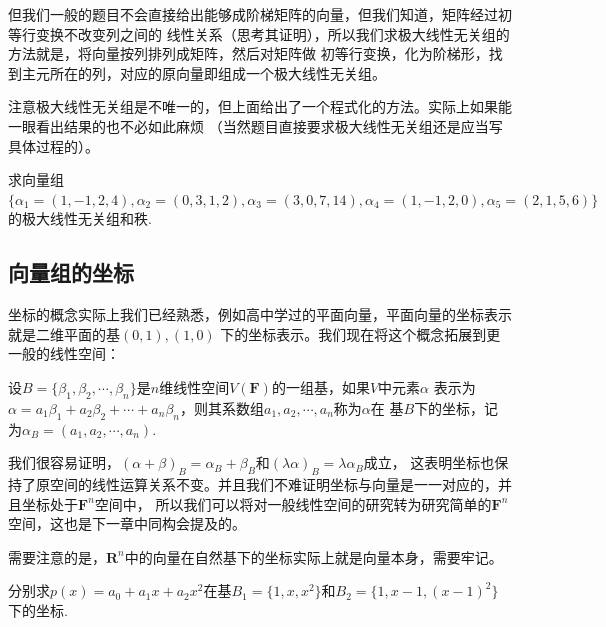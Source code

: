 但我们一般的题目不会直接给出能够成阶梯矩阵的向量，但我们知道，矩阵经过初等行变换不改变列之间的
线性关系（思考其证明），所以我们求极大线性无关组的方法就是，将向量按列排列成矩阵，然后对矩阵做
初等行变换，化为阶梯形，找到主元所在的列，对应的原向量即组成一个极大线性无关组。

注意极大线性无关组是不唯一的，但上面给出了一个程式化的方法。实际上如果能一眼看出结果的也不必如此麻烦
（当然题目直接要求极大线性无关组还是应当写具体过程的）。
\begin{example}
	求向量组$\{\alpha_1=(1,-1,2,4),\alpha_2=(0,3,1,2),\alpha_3=(3,0,7,14),\alpha_4=(1,-1,2,0),\alpha_5=(2,1,5,6)\}$
	的极大线性无关组和秩.
\end{example}

\subsection{向量组的坐标}
坐标的概念实际上我们已经熟悉，例如高中学过的平面向量，平面向量的坐标表示就是二维平面的基$(0,1),(1,0)$
下的坐标表示。我们现在将这个概念拓展到更一般的线性空间：
\begin{definition}
	设$B=\{\beta_1,\beta_2,\cdots,\beta_n\}$是$n$维线性空间$V(\mathbf{F})$的一组基，如果$V$中元素$\alpha$
	表示为$\alpha=a_1\beta_1+a_2\beta_2+\cdots+a_n\beta_n$，则其系数组$a_1,a_2,\cdots,a_n$称为$\alpha$在
	基$B$下的坐标，记为$\alpha_B=(a_1,a_2,\cdots,a_n)$.
\end{definition}
我们很容易证明，$(\alpha+\beta)_B=\alpha_B+\beta_B$和$(\lambda\alpha)_B=\lambda\alpha_B$成立，
这表明坐标也保持了原空间的线性运算关系不变。并且我们不难证明坐标与向量是一一对应的，并且坐标处于$\mathbf{F}^n$空间中，
所以我们可以将对一般线性空间的研究转为研究简单的$\mathbf{F}^n$空间，这也是下一章中同构会提及的。

需要注意的是，$\mathbf{R}^n$中的向量在自然基下的坐标实际上就是向量本身，需要牢记。
\begin{example}
	分别求$p(x)=a_0+a_1x+a_2x^2$在基$B_1=\{1,x,x^2\}$和$B_2=\{1,x-1,(x-1)^2\}$下的坐标.
\end{example}
